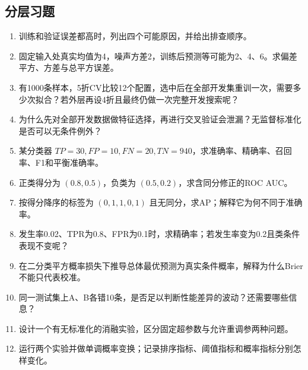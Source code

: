 \documentclass[UTF8,fontset=none,zihao=-4,a4paper]{ctexart}
\numberwithin{equation}{section}
\numberwithin{figure}{section}
\begin{document}
\clearpage
\subsection{分层习题}
\begin{enumerate}[label=14.\arabic*.,before={\interlinepenalty=10000}]
\item 训练和验证误差都高时，列出四个可能原因，并给出排查顺序。
\item 固定输入处真实均值为4，噪声方差2，训练后预测等可能为2、4、6。求偏差平方、方差与总平方误差。
\item 有1000条样本，5折CV比较12个配置，选中后在全部开发集重训一次，需要多少次拟合？若外层再设4折且最终仍做一次完整开发搜索呢？
\item 为什么先对全部开发数据做特征选择，再进行交叉验证会泄漏？无监督标准化是否可以无条件例外？
\item 某分类器 $TP=30,FP=10,FN=20,TN=940$，求准确率、精确率、召回率、F1和平衡准确率。
\item 正类得分为 $(0.8,0.5)$，负类为 $(0.5,0.2)$，求含同分修正的ROC AUC。
\item 按得分降序的标签为 $(0,1,1,0,1)$ 且无同分，求AP；解释它为何不同于准确率。
\item 发生率0.02、TPR为0.8、FPR为0.1时，求精确率；若发生率变为0.2且类条件表现不变呢？
\item 在二分类平方概率损失下推导总体最优预测为真实条件概率，解释为什么Brier不能只代表校准。
\item 同一测试集上A、B各错10条，是否足以判断性能差异的波动？还需要哪些信息？
\item 设计一个有无标准化的消融实验，区分固定超参数与允许重调参两种问题。
\item 运行两个实验并做单调概率变换；记录排序指标、阈值指标和概率指标分别怎样变化。
\end{enumerate}

\clearpage
\end{document}
